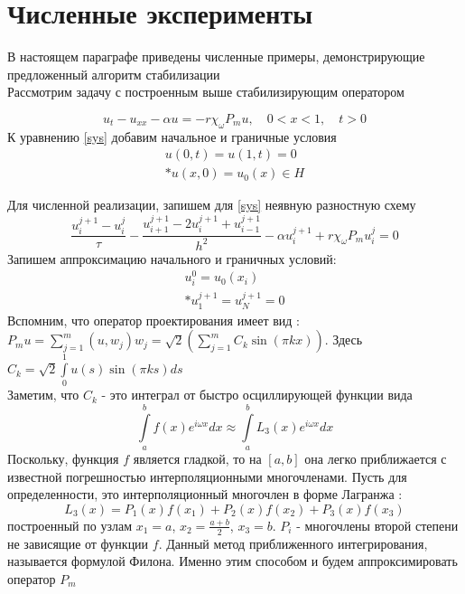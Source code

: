 \section{Численные эксперименты}
\vspace{1em}
В настоящем параграфе приведены численные примеры, демонстрирующие предложенный алгоритм стабилизации\\

Рассмотрим задачу с построенным выше стабилизирующим оператором

\begin{equation}\label{sys}
u_t - u_{xx} - \alpha u = -r\chi_{\omega}P_m u, \quad 0 < x < 1, \quad t > 0
\end{equation}
К уравнению \eqref{sys} добавим начальное и граничные условия
\begin{gather}\label{s_control}
u(0, t) = u(1, t) = 0 \\*
u(x, 0) = u_{0}(x) \in H \nonumber
\end{gather}

Для численной реализации, запишем для \eqref{sys} неявную разностную схему \\
\begin{equation}\label{scheme}
	\frac{u^{j + 1}_i - u^j_i}{\tau} - \frac{u_{i + 1}^{j + 1} - 2u_{i}^{j + 1} + u_{i - 1}^{j + 1}}{h^2} - \alpha u_{i}^{j + 1} + r\chi_{\omega}P_m u^j_i = 0
\end{equation}
Запишем аппроксимацию начального и граничных условий:\\
\begin{gather}
u_i^0 = u_0(x_i) \\*
u_1^{j+1} = u_N^{j+1} = 0 \nonumber
\end{gather}
Вспомним, что оператор проектирования имеет вид :\\
$P_m u = \sum \limits_{j=1}^{m} {(u, w_j) w_j} = \sqrt{2} (\sum \limits_{j=1}^{m} {C_k \sin{(\pi k x)}})$. Здесь $C_k = \sqrt{2} \int\limits_0^1{u(s)\sin{(\pi k s)} ds}$\\
Заметим, что $C_k$ - это интеграл от быстро осциллирующей функции вида
\begin{equation}
	\int\limits_a^b{f(x) e^{i\omega x} dx} \approx \int\limits_a^b{L_3(x) e^{i\omega x} dx}
\end{equation}
Поскольку, функция $f$ является гладкой, то на $[a, b]$ она легко приближается с известной погрешностью интерполяционными многочленами. Пусть для определенности, это интерполяционный многочлен в форме Лагранжа :
\begin{equation}
	L_3(x) = P_1(x)f(x_1) + P_2(x)f(x_2) + P_3(x)f(x_3)
\end{equation}
построенный по узлам $x_1 = a$, $x_2 = \frac{a + b}{2}$, $x_3 = b$. $P_i$ - многочлены второй степени не зависящие от функции $f$. Данный метод приближенного интегрирования, называется формулой Филона. Именно этим способом и будем аппроксимировать оператор $P_m$\\

